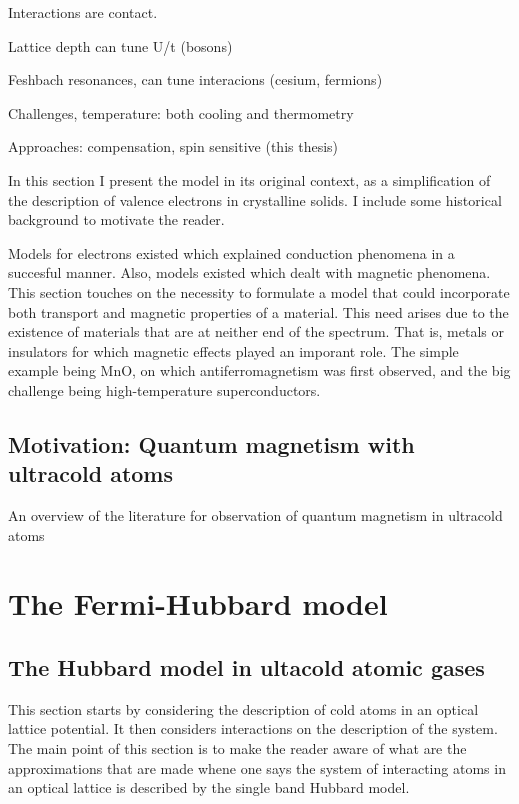 \documentclass[oneside,11pt]{memoir}
\begin{document}
Interactions are contact.   

Lattice depth can tune U/t  (bosons) 
 
Feshbach resonances, can tune interacions (cesium, fermions)  

Challenges, temperature:  both cooling and thermometry

Approaches:  compensation,  spin sensitive (this thesis)  




In this section I present the model in its original context, as a
simplification of the description of valence electrons in crystalline solids.
I include some historical background to motivate the reader.  

Models for electrons existed which explained conduction phenomena in a
succesful manner.  Also, models existed which dealt with magnetic phenomena.
This section touches on the necessity to formulate a model that could
incorporate both transport and magnetic properties of a material.   This need
arises due to the existence of materials that are at neither end of the
spectrum.  That is, metals or insulators for which magnetic effects played an
imporant role.   The simple example being MnO, on which antiferromagnetism was
first observed,  and the big challenge being high-temperature
superconductors. 

\section{ Motivation:  Quantum magnetism with ultracold atoms }

An overview of the literature for observation of quantum magnetism in ultracold
atoms

\chapter{The Fermi-Hubbard model}

\section{ The Hubbard model in ultacold atomic gases }

This section starts by considering the description of cold atoms in an optical
lattice potential.  It then considers interactions on the description of the
system.  The main point of this section is to make the reader aware of  what
are the approximations that are made whene one says the system of interacting
atoms in an optical lattice is described by the single band Hubbard model.   
\end{document}
